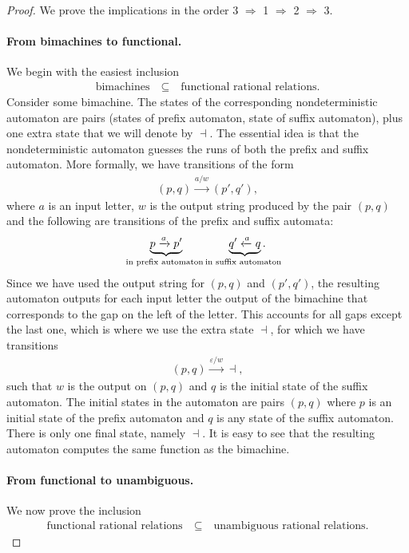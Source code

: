 \begin{proof}
    We prove the implications in the order 3 $\Rightarrow$ 1 $\Rightarrow$ 2 $\Rightarrow$ 3.

    \paragraph*{From bimachines to functional.}
    We begin with the  easiest inclusion 
    \begin{align*}
    \text{bimachines} \quad \subseteq \quad \text{functional rational relations.}
    \end{align*}
    Consider some bimachine. The states of the corresponding nondeterministic automaton are pairs (states of prefix automaton, state of suffix automaton), plus one extra state that we will denote by $\dashv$. The essential idea is that the nondeterministic automaton guesses the runs of both the prefix and suffix automaton. More formally, we have transitions of the form 
    \begin{align*}
    (p,q) \xrightarrow{ a / w} (p',q'),
    \end{align*}
    where $a$ is an input letter,  $w$ is the output string produced by the pair $(p,q)$ and the following are transitions of the prefix and suffix automata:
    \begin{align*}
      \myunderbrace{p \xrightarrow a p'}{in prefix automaton} \qquad \qquad
      \myunderbrace{q' \xleftarrow a q}{in suffix automaton}.
    \end{align*}
    Since we have used the output string for $(p,q)$ and $(p',q')$, the resulting automaton outputs for each input  letter the output  of the bimachine that corresponds to the gap on the left of the letter. This accounts for all gaps except the last one, which is where we use the extra state $\dashv$, for which we have transitions 
    \begin{align*}
    (p,q) \xrightarrow {\varepsilon/ w} \dashv,
    \end{align*}
    such that $w$ is the output on $(p,q)$ and $q$ is the initial state of the suffix automaton. The initial states in the automaton are pairs $(p,q)$ where $p$ is an initial state of the prefix automaton and $q$ is any state of the suffix automaton. There is only one final state, namely $\dashv$. It is easy to see that the resulting automaton computes the same function as the bimachine.

    \paragraph*{From functional to unambiguous.}
    We now prove the  inclusion
    \begin{align*}
    \text{functional rational relations} \quad \subseteq \quad \text{unambiguous rational relations.}
    \end{align*}
    

\end{proof}

